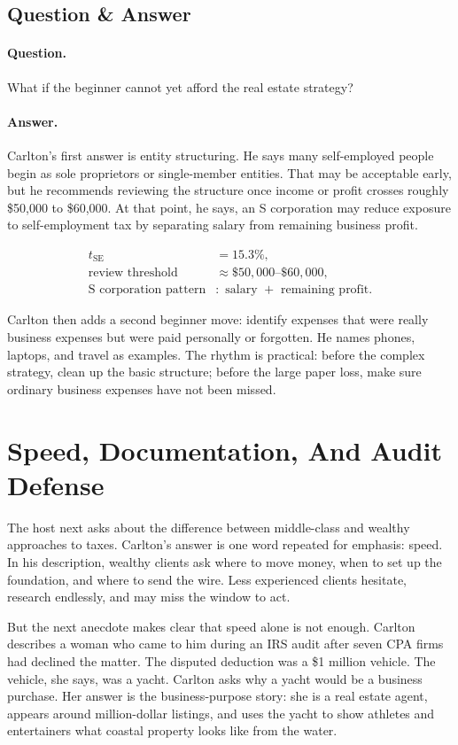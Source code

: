 \subsection{Question \& Answer}

\paragraph{Question.}
What if the beginner cannot yet afford the real estate strategy?

\paragraph{Answer.}
Carlton's first answer is entity structuring. He says many self-employed people begin as sole proprietors or single-member entities. That may be acceptable early, but he recommends reviewing the structure once income or profit crosses roughly \$50,000 to \$60,000. At that point, he says, an S corporation may reduce exposure to self-employment tax by separating salary from remaining business profit.

\begin{align}
t_{\mathrm{SE}} &= 15.3\%,\\
\text{review threshold} &\approx \$50{,}000\text{--}\$60{,}000,\\
\text{S corporation pattern} &: \text{ salary }+\text{ remaining profit}.
\end{align}

Carlton then adds a second beginner move: identify expenses that were really business expenses but were paid personally or forgotten. He names phones, laptops, and travel as examples. The rhythm is practical: before the complex strategy, clean up the basic structure; before the large paper loss, make sure ordinary business expenses have not been missed.

\section{Speed, Documentation, And Audit Defense}

The host next asks about the difference between middle-class and wealthy approaches to taxes. Carlton's answer is one word repeated for emphasis: speed. In his description, wealthy clients ask where to move money, when to set up the foundation, and where to send the wire. Less experienced clients hesitate, research endlessly, and may miss the window to act.

But the next anecdote makes clear that speed alone is not enough. Carlton describes a woman who came to him during an IRS audit after seven CPA firms had declined the matter. The disputed deduction was a \$1 million vehicle. The vehicle, she says, was a yacht. Carlton asks why a yacht would be a business purchase. Her answer is the business-purpose story: she is a real estate agent, appears around million-dollar listings, and uses the yacht to show athletes and entertainers what coastal property looks like from the water.

